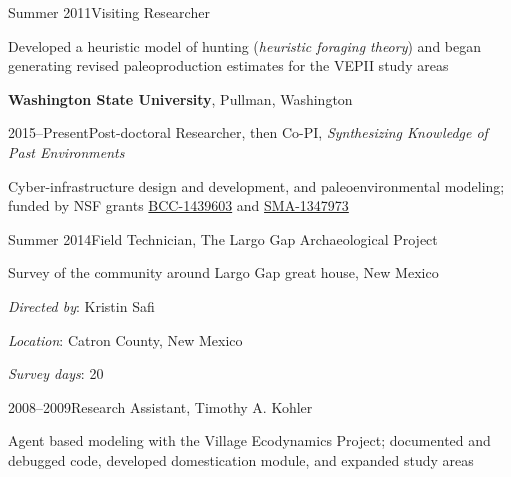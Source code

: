 \vspace{0.1in}

\begin{list1}
\item[] Summer 2011\hspace{.2cm}Visiting Researcher
\begin{list2}
\item[] Developed a heuristic model of hunting (\emph{heuristic foraging theory}) and began generating revised paleoproduction estimates for the VEPII study areas
\end{list2}
\end{list1}


{\bf Washington State University}, Pullman, Washington

\begin{list1}
\item[] 2015–Present\hspace{.2cm}Post-doctoral Researcher, then Co-PI, \emph{Synthesizing Knowledge of Past Environments}
\begin{list2}
\item[] Cyber-infrastructure design and development, and paleoenvironmental modeling; funded by NSF grants \href{http://www.nsf.gov/awardsearch/showAward?AWD_ID=1439603}{BCC-1439603} and \href{https://www.nsf.gov/awardsearch/showAward?AWD_ID=1637171}{SMA-1347973}
\end{list2}
\end{list1}

\vspace{0.1in}

\begin{list1}
\item[] Summer 2014\hspace{.2cm}Field Technician, The Largo Gap Archaeological Project
\begin{list2}
\item[] Survey of the community around Largo Gap great house, New Mexico
\item[] \emph{Directed by}: Kristin Safi
\item[] \emph{Location}: Catron County, New Mexico
\item[] \emph{Survey days}: 20
\end{list2}
\end{list1}

\vspace{0.1in}

\begin{list1}
\item[] 2008–2009\hspace{.2cm}Research Assistant, Timothy A. Kohler
\begin{list2}
\item[] Agent based modeling with the Village Ecodynamics Project; documented and debugged code, developed domestication module, and expanded study areas
\end{list2}
\end{list1}


